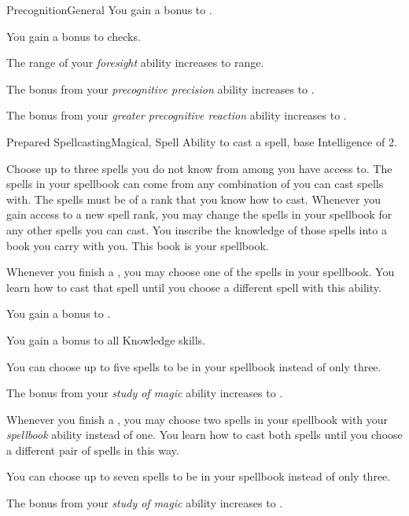 \begin{feat}{Precognition}{General}
         You gain a  bonus to .

         You gain a  bonus to  checks.

         The range of your \textit{foresight} ability increases to \rnglong range.

         The bonus from your \textit{precognitive precision} ability increases to .

         The bonus from your \textit{greater precognitive reaction} ability increases to .
    \end{feat}

    \begin{feat}{Prepared Spellcasting}{Magical, Spell}
        \featpre Ability to cast a spell, base Intelligence of 2.

         Choose up to three spells you do not know from among  you have access to.
        The spells in your spellbook can come from any combination of  you can cast spells with.
        The spells must be of a rank that you know how to cast.
        Whenever you gain access to a new spell rank, you may change the spells in your spellbook for any other spells you can cast.
        You inscribe the knowledge of those spells into a book you carry with you.
        This book is your spellbook.
        
        Whenever you finish a , you may choose one of the spells in your spellbook.
        You learn how to cast that spell until you choose a different spell with this ability.

         You gain a  bonus to  .

         You gain a  bonus to all Knowledge skills.

         You can choose up to five spells to be in your spellbook instead of only three.

         The bonus from your \textit{study of magic} ability increases to .

         Whenever you finish a , you may choose two spells in your spellbook with your \textit{spellbook} ability instead of one.
        You learn how to cast both spells until you choose a different pair of spells in this way.

         You can choose up to seven spells to be in your spellbook instead of only three.

         The bonus from your \textit{study of magic} ability increases to .
    \end{feat}


